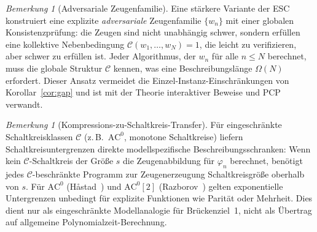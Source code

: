 \documentclass[aps,prd,twocolumn,superscriptaddress,nofootinbib]{revtex4-2}
\theoremstyle{definition}
\theoremstyle{remark}
\newtheorem{remark}[theorem]{Bemerkung}
\begin{document}
\begin{remark}[Adversariale Zeugenfamilie]
\label{rem:adversarial-witness}
Eine stärkere Variante der ESC konstruiert eine explizite \emph{adversariale} Zeugenfamilie $\{w_n\}$ mit einer globalen Konsistenzprüfung: die Zeugen sind nicht unabhängig schwer, sondern erfüllen eine kollektive Nebenbedingung $\mathcal{C}(w_1, \ldots, w_N) = 1$, die leicht zu verifizieren, aber schwer zu erfüllen ist. Jeder Algorithmus, der $w_n$ für alle $n \leq N$ berechnet, muss die globale Struktur $\mathcal{C}$ \glqq kennen\grqq{}, was eine Beschreibungslänge $\Omega(N)$ erfordert. Dieser Ansatz vermeidet die Einzel-Instanz-Einschränkungen von Korollar~\ref{cor:gap} und ist mit der Theorie interaktiver Beweise und PCP verwandt.
\end{remark}

\begin{remark}[Kompressions-zu-Schaltkreis-Transfer]
\label{rem:compression-circuit}
Für eingeschränkte Schaltkreisklassen $\mathcal{C}$ (z.\,B.\ $\mathrm{AC}^0$, monotone Schaltkreise) liefern Schaltkreisuntergrenzen direkte modellspezifische Beschreibungsschranken: Wenn kein $\mathcal{C}$-Schaltkreis der Größe $s$ die Zeugenabbildung für $\varphi_n$ berechnet, benötigt jedes $\mathcal{C}$-beschränkte Programm zur Zeugenerzeugung Schaltkreisgröße oberhalb von $s$. Für $\mathrm{AC}^0$ (H\r{a}stad~\cite{Hastad1987}) und $\mathrm{AC}^0[2]$ (Razborov~\cite{Razborov1987}) gelten exponentielle Untergrenzen unbedingt für explizite Funktionen wie Parität oder Mehrheit. Dies dient nur als eingeschränkte Modellanalogie für Brückenziel~1, nicht als Übertrag auf allgemeine Polynomialzeit-Berechnung.
\end{remark}
\end{document}
